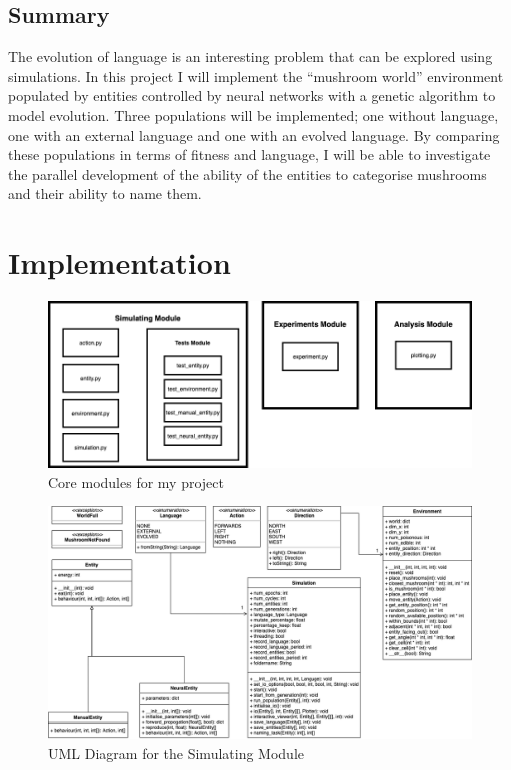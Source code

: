 \documentclass[12pt,a4paper,twoside,openright]{report}
\begin{document}
\section{Summary}\label{section:summary}

The evolution of language is an interesting problem that can be explored using simulations. In this project I will implement the ``mushroom world'' environment populated by entities controlled by neural networks with a genetic algorithm to model evolution. Three populations will be implemented; one without language, one with an external language and one with an evolved language. By comparing these populations in terms of fitness and language, I will be able to investigate the parallel development of the ability of the entities to categorise mushrooms and their ability to name them.


\chapter{Implementation}

\begin{figure}[t]
  \centering
  \includegraphics[width=.9\linewidth]{figs/modules}
  \caption{Core modules for my project}
  \label{fig:modules}
\end{figure}

\begin{figure}[t]
  \centering
  \includegraphics[width=.9\linewidth]{figs/uml}
  \caption{UML Diagram for the Simulating Module}
  \label{fig:uml}
\end{figure}
\end{document}
